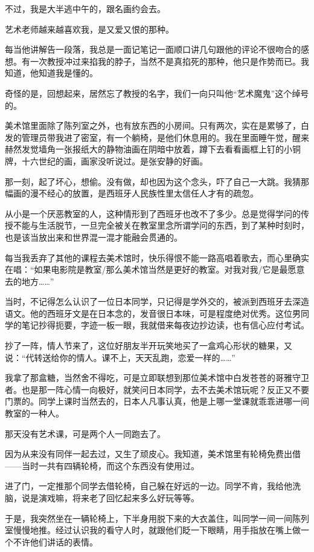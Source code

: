 \par 不过，我是大半逃中午的，跟名画约会去。
\par 艺术老师越来越喜欢我，是又爱又恨的那种。
\par 每当他讲解告一段落，我总是一面记笔记一面顺口讲几句跟他的评论不很吻合的感想。有一次教授冲过来掐我的脖子，当然不是真掐死的那种，他只是作势而已。我知道，他知道我是懂的。
\par 奇怪的是，回想起来，居然忘了教授的名字，我们一向只叫他“艺术魔鬼”这个绰号的。
\par 美术馆里面除了陈列室之外，也有放东西的小房间。只有两次，实在是累够了，白发的管理员带我进了密室，有一个躺椅，是他们休息用的。我在里面睡午觉，醒来赫然发觉墙角一张报纸大的静物油画在阴暗中放着，蹲下去看看画框上钉的小铜牌，十六世纪的画，画家没听说过。是张安静的好画。
\par 那一刻，起了坏心，想偷。没有做，却也因为这个念头，吓了自己一大跳。我猜那幅画的漫不经心的放置，是西班牙人民族性里太信任人才有的疏忽。
\par 从小是一个厌恶教室的人，这种情形到了西班牙也改不了多少。总是觉得学问的传授不能与生活脱节，一旦完全被关在教室里念所谓学问的东西，到了某种时刻时，也是该当放出来和世界混一混才能融会贯通的。
\par 每当我丢弃了其他的课程去美术馆时，快乐得恨不能一路高唱着歌去，而心里确实在唱：“如果电影院是教室/那么美术馆当然是更好的教室。对我对我/它是最愿意去的地方……”
\par 当时，不记得怎么认识了一位日本同学，只记得是学外交的，被派到西班牙去深造语文。他的西班牙文是在日本念的，发音很日本味，可是程度绝对优秀。这位男同学的笔记抄得扼要，字迹一板一眼，我就借来每夜边抄边读，也有信心应付考试。
\par 抄了一阵，情人节来了，这位好朋友半开玩笑地买了一盒鸡心形状的糖果，又说：“代转送给你的情人。课不上，天天乱跑，恋爱一样的……”
\par 我拿了那盒糖，当然舍不得吃，可是立即联想到那位美术馆中白发苍苍的哥雅守卫者。也是那一阵心情一向极好，就笑问日本同学，去不去美术馆玩呢？反正又不要门票的。同学上课时当然去的，日本人凡事认真，他是上哪一堂课就乖乖进哪一间教室的一种人。
\par 那天没有艺术课，可是两个人一同跑去了。
\par 因为从来没有同伴一起去过，又生了顽皮心。我知道，美术馆里有轮椅免费出借——当时一共有四辆轮椅，而这个东西没有使用过。
\par 进了门，一定推那个同学去借轮椅，自己躲在好远的一边。同学不肯，我给他洗脑，说是演戏嘛，将来老了回忆起来多么好玩等等。
\par 于是，我突然坐在一辆轮椅上，下半身用脱下来的大衣盖住，叫同学一间一间陈列室慢慢地推。经过认识我的看守人时，就跟他们眨一下眼睛，用手指放在嘴上做一个不许他们讲话的表情。

